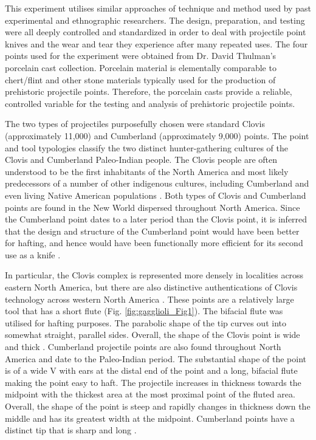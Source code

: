 	 This experiment utilises similar approaches of technique and method used by past experimental and ethnographic researchers. The design, preparation, and testing were all deeply controlled and standardized in order to deal with projectile point knives and the wear and tear they experience after many repeated uses. The four points used for the experiment were obtained from Dr. David Thulman’s porcelain cast collection. Porcelain material is elementally comparable to chert/flint and other stone materials typically used for the production of prehistoric projectile points. Therefore, the porcelain casts provide a reliable, controlled variable for the testing and analysis of prehistoric projectile points. 
	 
	 The two types of projectiles purposefully chosen were standard Clovis (approximately 11,000\BC) and Cumberland (approximately 9,000\BC) points. The point and tool typologies classify the two distinct hunter-gathering cultures of the Clovis and Cumberland Paleo-Indian people. The Clovis people are often understood to be the first inhabitants of the North America and most likely predecessors of a number of other indigenous cultures, including Cumberland and even living Native American populations \parencite{Haynes_2002}. Both types of Clovis and Cumberland points are found in the New World dispersed throughout North America. Since the Cumberland point dates to a later period than the Clovis point, it is inferred that the design and structure of the Cumberland point would have been better for hafting, and hence would have been functionally more efficient for its second use as a knife \parencite{Anderson_2010}.
	 
	 In particular, the Clovis complex is represented more densely in localities across eastern North America, but there are also distinctive authentications of Clovis technology across western North America \parencite{Morrow_1995}. These points are a relatively large tool that has a short flute (Fig. \ref{fig:gagglioli_Fig1}). The bifacial flute was utilised for hafting purposes. The parabolic shape of the tip curves out into somewhat straight, parallel sides. Overall, the shape of the Clovis point is wide and thick \parencite{Anderson_2010}. Cumberland projectile points are also found throughout North America and date to the Paleo-Indian period. The substantial shape of the point is of a wide V with ears at the distal end of the point and a long, bifacial flute making the point easy to haft. The projectile increases in thickness towards the midpoint with the thickest area at the most proximal point of the fluted area. Overall, the shape of the point is steep and rapidly changes in thickness down the middle and has its greatest width at the midpoint. Cumberland points have a distinct tip that is sharp and long \parencite{Anderson_2010}.

